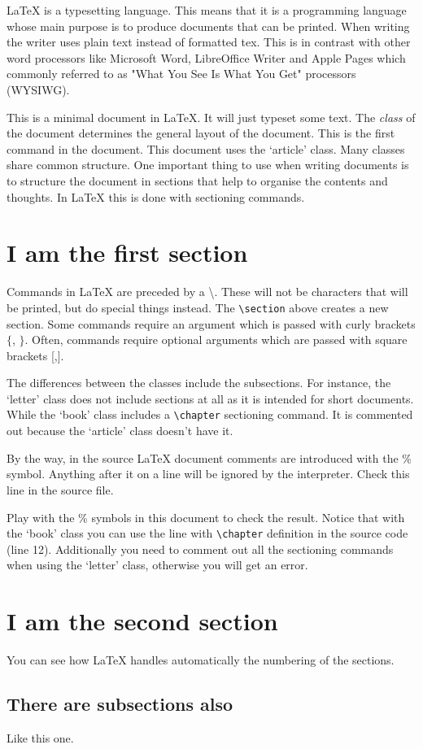 \documentclass[a4paper]{article}
\begin{document}
\LaTeX{} is a typesetting language. This means that it is a programming language whose main purpose is to produce documents that can be printed. When writing the writer uses plain text instead of formatted tex. This is in contrast with other word processors like Microsoft Word,  LibreOffice Writer and Apple Pages which commonly referred to as "What You See Is What You Get" processors (WYSIWG). 

This is a minimal document in \LaTeX. It will just typeset some text. The \emph{class} of the document determines the general layout of the document. This is the first command in the document. This document uses the `article' class. Many classes share common structure. One important thing to use when writing documents is to structure the document in sections that help to organise the contents and thoughts. In \LaTeX{} this is done with sectioning commands.


\section{I am the first section}

Commands in \LaTeX{} are preceded by a \textbackslash. These will not be characters that will be printed, but do special things instead. The \texttt{\textbackslash{}section} above creates a new section. Some commands require an argument which is passed with curly brackets $\{$, $\}$. Often, commands require optional arguments which are passed with square brackets [,].

The differences between the classes include the subsections. For instance, the `letter' class does not include sections at all as it is intended for short documents. While the `book' class includes a \texttt{\textbackslash{}chapter} sectioning command. It is commented out because the `article' class doesn't have it. 

By the way, in the source \LaTeX{} document comments are introduced with the \% symbol. Anything after it on a line will be ignored by the interpreter. Check this line in the source file.%

Play with the \% symbols in this document to check the result. Notice that with the `book' class you can use the line with \texttt{\textbackslash{}chapter} definition in the source code (line 12). Additionally you need to comment out all the sectioning commands when using the `letter' class, otherwise you will get an error.

\section{I am the second section}

You can see how \LaTeX{} handles automatically the numbering of the sections. 

\subsection{There are subsections also}

Like this one.
\end{document}
